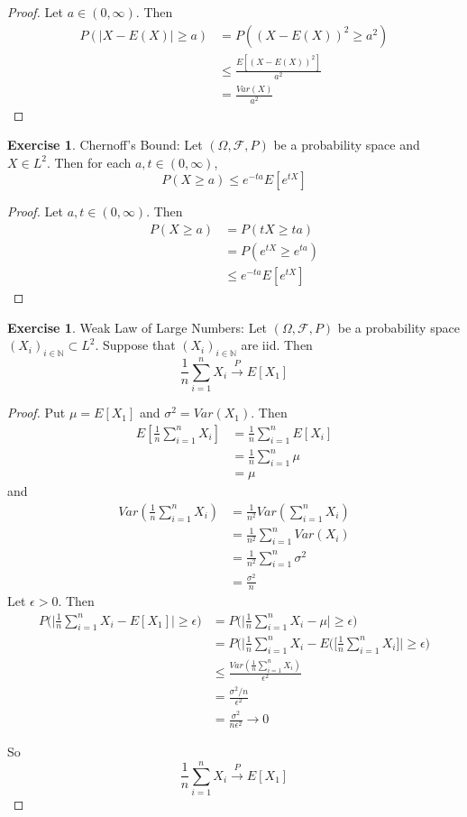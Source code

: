 \documentclass[12pt]{amsart}
\theoremstyle{definition}
\newtheorem{ex}[definition]{Exercise}
\newcommand{\ep}{\epsilon}
\newcommand{\sig}{\sigma}
\newcommand{\Om}{\Omega}
\newcommand{\N}{\mathbb{N}}
\newcommand{\MF}{\mathcal{F}}
\newcommand{\conv}[1]{\xrightarrow{#1}}
\begin{document}
	\begin{proof}
		Let $a \in (0, \infty)$. Then 
		\begin{align*}
			P(| X - E(X) | \geq a) 
			&= P((X - E(X))^2 \geq a^2) \\
			&\leq \frac{E[(X - E(X))^2]}{a^2} \\
			&= \frac{Var(X)}{a^2}  
		\end{align*}
	\end{proof}
	
	\begin{ex}{Chernoff's Bound:}
		Let $(\Om, \MF, P)$ be a probability space and $X \in L^2$. Then for each $a, t \in (0, \infty)$, $$P( X \geq a) \leq e^{-ta}E[e^{tX}]$$
	\end{ex}
	
	\begin{proof}
		Let $a, t \in (0, \infty)$. Then 
		\begin{align*}
			P( X \geq a)
			&= P(tX \geq ta) \\
			&= P(e^{tX} \geq e^{ta}) \\
			& \leq e^{-ta}E[e^{tX}]
		\end{align*}
	\end{proof}
	
	\begin{ex}{Weak Law of Large Numbers:}
		Let $(\Om, \MF, P)$ be a probability space $(X_i)_{i\in \N} \subset L^2$. Suppose that $(X_i)_{i\in \N}$ are iid. Then $$\frac{1}{n}\sum_{i=1}^n X_i \conv{P} E[X_1]$$
	\end{ex}
	
	\begin{proof}
		Put $\mu = E[X_1]$ and $\sig^2 = Var(X_1)$. Then 
		\begin{align*}
			E[\frac{1}{n}\sum_{i=1}^n X_i] 
			&= \frac{1}{n} \sum_{i=1}^nE[X_i] \\
			&= \frac{1}{n} \sum_{i=1}^n \mu \\
			&= \mu
		\end{align*} and 
		\begin{align*}
			Var(\frac{1}{n}\sum_{i=1}^n X_i) 
			&= \frac{1}{n^2} Var(\sum_{i=1}^n X_i) \\
			&= \frac{1}{n^2} \sum_{i=1}^n Var(X_i) \\
			&= \frac{1}{n^2} \sum_{i=1}^n \sig^2 \\
			&= \frac{\sig^2}{n}
		\end{align*}
		Let $\ep >0$. Then 
		\begin{align*}
			P\bigg(\bigg | \frac{1}{n} \sum_{i=1}^n X_i - E[X_1] \bigg | \geq \ep \bigg) 
			& = P\bigg(\bigg| \frac{1}{n} \sum_{i=1}^n X_i - \mu \bigg| \geq \ep\bigg) \\
			& = P\bigg(\bigg| \frac{1}{n} \sum_{i=1}^n X_i - E(\bigg[\frac{1}{n}\sum_{i=1}^n X_i \bigg] \bigg| \geq \ep\bigg) \\ 
			&\leq \frac{Var(\frac{1}{n} \sum_{i=1}^n X_i)}{\ep^2} \\
			& =  \frac{\sig^2 / n}{\ep^2} \\
			&= \frac{\sig^2}{n\ep^2} \rightarrow 0
		\end{align*}
		
		So $$\frac{1}{n}\sum_{i=1}^n X_i \conv{P} E[X_1]$$
	\end{proof}
	
\end{document}
